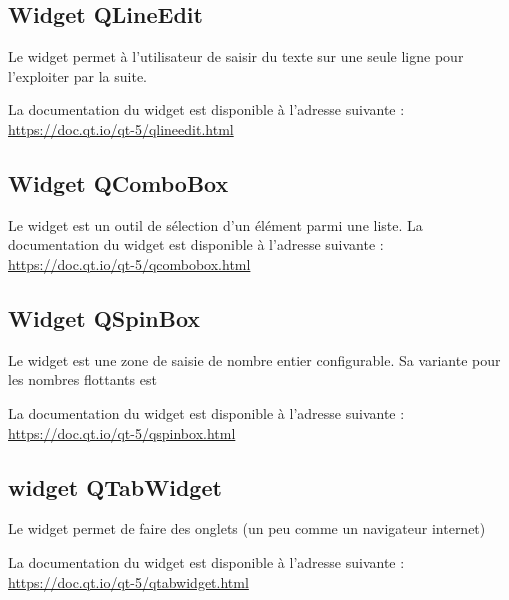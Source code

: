 \subsection{Widget QLineEdit}

Le widget  permet à l'utilisateur de saisir du texte sur une seule ligne pour l'exploiter par la suite. 


La documentation du widget est disponible à l'adresse suivante : \newline  \url{https://doc.qt.io/qt-5/qlineedit.html}


\subsection{Widget QComboBox}

Le widget  est un outil de sélection d'un élément parmi une liste. \newline \newline
La documentation du widget est disponible à l'adresse suivante : \\  \url{https://doc.qt.io/qt-5/qcombobox.html} 



\subsection{Widget QSpinBox}

Le widget  est une zone de saisie de nombre entier configurable.
Sa variante pour les nombres flottants est  

La documentation du widget est disponible à l'adresse suivante : \newline  \url{https://doc.qt.io/qt-5/qspinbox.html} 


\subsection{widget QTabWidget}

Le widget  permet de faire des onglets (un peu comme un navigateur internet)


La documentation du widget est disponible à l'adresse suivante : \newline  \url{https://doc.qt.io/qt-5/qtabwidget.html} 

